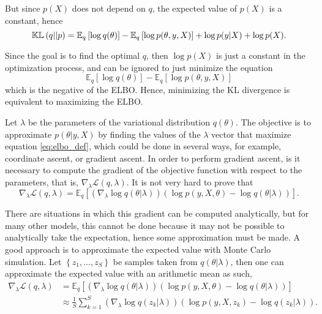 But since $p(X)$ does not depend on $q$, the expected value of $p(X)$ is a constant, hence
\begin{equation}
 \mathbb{KL}\left( q || p \right) =
 \mathbb{E}_q \left[ \log  q(\theta) \right] - \mathbb{E}_q \left[ \log p(\theta, y, X) \right] + \log p(y | X) + \log p(X).
\end{equation}

Since the goal is to find the optimal $q$, then $\log p(X)$ is just a constant in the optimization process, and can be ignored to just minimize the equation
\begin{equation}
  \mathbb{E}_q \left[ \log  q(\theta) \right] - \mathbb{E}_q \left[ \log p(\theta, y, X) \right]
\end{equation}
which is the negative of the ELBO. Hence, minimizing the KL divergence is equivalent to maximizing the ELBO.

Let $\lambda$ be the parameters of the variational distribution $q(\theta)$. The objective is to approximate $p(\theta | y, X)$ by finding the values of the $\lambda$ vector that maximize equation \ref{eq:elbo_def}, which could be done in several ways, for example, coordinate ascent, or gradient ascent. In order to perform gradient ascent, is it necessary to compute the gradient of the objective function with respect to the parameters, that is, $\nabla_{\lambda} \mathcal{L}(q, \lambda)$. It is not very hard to prove that
\begin{equation}
  \label{eq:ELBO_gradient}
  \nabla_{\lambda} \mathcal{L}(q, \lambda) =
  \mathbb{E}_q \left[ \left( \nabla_{\lambda} \log q(\theta | \lambda) \right) \left( \log p(y, X, \theta) - \log q(\theta | \lambda) \right) \right].
\end{equation}

There are situations in which this gradient can be computed analytically, but for many other models, this cannot be done because it may not be possible to analytically take the expectation, hence some approximation must be made. A good approach is to approximate the expected value with Monte Carlo simulation. Let $\left\{ z_1, ..., z_S \right\}$ be samples taken from $q(\theta | \lambda)$, then one can approximate the expected value with an arithmetic mean as such,
\begin{equation}
  \begin{split}
  \nabla_{\lambda} \mathcal{L}(q, \lambda) &=
  \mathbb{E}_q \left[ \left( \nabla_{\lambda} \log q(\theta | \lambda) \right) \left( \log p(y, X, \theta) - \log q(\theta | \lambda) \right) \right] \\
  & \approx \frac{1}{S} \sum_{k = 1}^S \left( \nabla_{\lambda} \log q(z_k | \lambda) \right) \left( \log p(y, X, z_k) - \log q(z_k | \lambda) \right).
  \end{split}
\end{equation}

